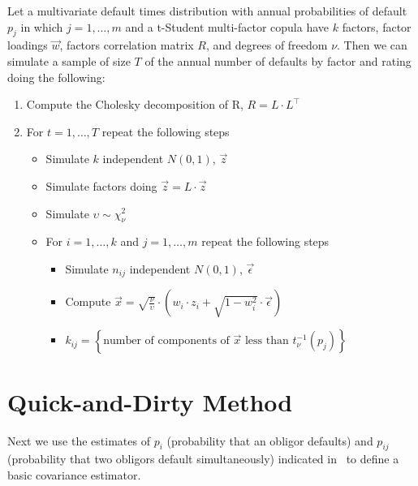 \documentclass[11pt,fleqn]{book} %
\begin{document}
\begin{algorithm}
	\label{alg:snod}
	Let a multivariate default times distribution with annual probabilities of
	default $p_j$ in which $j=1,\dots,m$ and a t-Student multi-factor copula 
	have $k$ factors, factor loadings $\vec{w}$, factors correlation matrix $R$, 
	and degrees of freedom $\nu$. Then we can simulate a sample of size $T$ of 
	the annual number of defaults by factor and rating doing the following:
	\begin{enumerate}
		\item Compute the Cholesky decomposition of R, $R = L \cdot L^\intercal$
		\item For $t=1,\dots,T$ repeat the following steps
		\begin{itemize}
			\item Simulate $k$ independent $N(0,1)$, $\vec{z}$
			\item Simulate factors doing $\vec{z} = L \cdot \vec{z}$
			\item Simulate $\upsilon \sim \chi_{\nu}^2$
			\item For $i=1,\dots,k$ and $j=1,\dots,m$ repeat the following steps
			\begin{itemize}
				\item Simulate $n_{ij}$ independent $N(0,1)$, $\vec{\epsilon}$
				\item Compute $\vec{x} = \sqrt{\frac{\nu}{\upsilon}} \cdot \left( w_i \cdot z_i + \sqrt{1-w_i^2} \cdot \vec{\epsilon} \right)$
				\item $k_{ij} = \left\{ \text{number of components of $\vec{x}$ less than $t_{\nu}^{-1}(p_j)$} \right\} $
			\end{itemize}
		\end{itemize}
	\end{enumerate}
\end{algorithm}

\section{Quick-and-Dirty Method}

Next we use the estimates of $p_i$ (probability that an obligor defaults)
and $p_{ij}$ (probability that two obligors default simultaneously) indicated 
in~\cite{nagpal:2001} to define a basic covariance estimator. 
\end{document}
